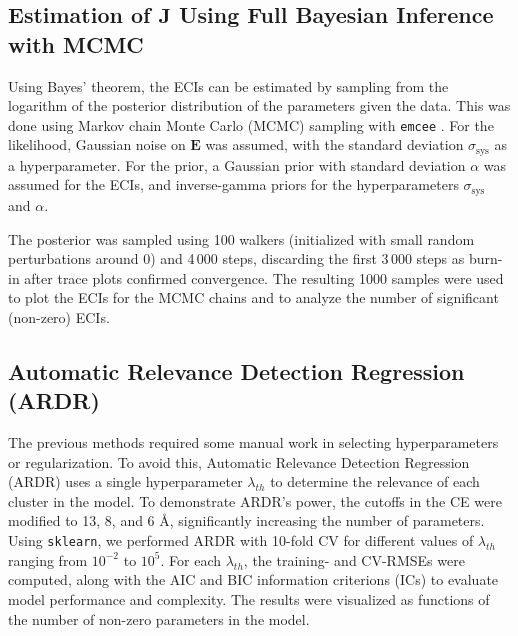 \documentclass[a4paper, 12pt]{article}
\begin{document}
\subsection{Estimation of \texorpdfstring{$\bm{J}$}{J} Using Full Bayesian Inference with MCMC}
Using Bayes' theorem, the ECIs can be estimated by sampling from the logarithm of the posterior distribution of the parameters given the data. This was done using Markov chain Monte Carlo (MCMC) sampling with \texttt{emcee} \cite{emcee}. For the likelihood, Gaussian noise on $\bm{E}$ was assumed, with the standard deviation $\sigma_{\text{sys}}$ as a hyperparameter.
For the prior, a Gaussian prior with standard deviation $\alpha$ was assumed for the ECIs, and inverse-gamma priors for the hyperparameters $\sigma_{\text{sys}}$ and $\alpha$. 

The posterior was sampled using 100 walkers (initialized with small random perturbations around 0) and 4\,000 steps, discarding the first 3\,000 steps as burn-in after trace plots confirmed convergence. The resulting 1000 samples were used to plot the ECIs for the MCMC chains and to analyze the number of significant (non-zero) ECIs.
\vspace{-0.2cm}
\subsection{Automatic Relevance Detection Regression (ARDR)}
The previous methods required some manual work in selecting hyperparameters or regularization. To avoid this, Automatic Relevance Detection Regression (ARDR) uses a single hyperparameter $\lambda_{th}$ to determine the relevance of each cluster in the model. To demonstrate ARDR's power, the cutoffs in the CE were modified to 13, 8, and 6 Å, significantly increasing the number of parameters. Using \texttt{sklearn}, we performed ARDR with 10-fold CV for different values of $\lambda_{th}$ ranging from $10^{-2}$ to $10^5$. For each $\lambda_{th}$, the training- and CV-RMSEs were computed, along with the AIC and BIC information criterions (ICs) to evaluate model performance and complexity. The results were visualized as functions of the number of non-zero parameters in the model.
\vspace{-0.2cm}
\end{document}
